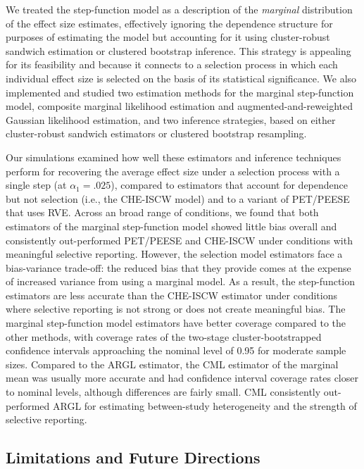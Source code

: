 \documentclass[
  american,
  man, donotrepeattitle,floatsintext]{apa7}
\begin{document}
We treated the step-function model as a description of the \emph{marginal} distribution of the effect size estimates, effectively ignoring the dependence structure for purposes of estimating the model but accounting for it using cluster-robust sandwich estimation or clustered bootstrap inference.
This strategy is appealing for its feasibility and because it connects to a selection process in which each individual effect size is selected on the basis of its statistical significance.
We also implemented and studied two estimation methods for the marginal step-function model, composite marginal likelihood estimation and augmented-and-reweighted Gaussian likelihood estimation, and two inference strategies, based on either cluster-robust sandwich estimators or clustered bootstrap resampling.

Our simulations examined how well these estimators and inference techniques perform for recovering the average effect size under a selection process with a single step (at \(\alpha_1 = .025\)), compared to estimators that account for dependence but not selection (i.e., the CHE-ISCW model) and to a variant of PET/PEESE that uses RVE.
Across an broad range of conditions, we found that both estimators of the marginal step-function model showed little bias overall and consistently out-performed PET/PEESE and CHE-ISCW under conditions with meaningful selective reporting.
However, the selection model estimators face a bias-variance trade-off:
the reduced bias that they provide comes at the expense of increased variance from using a marginal model. As a result, the step-function estimators are less accurate than the CHE-ISCW estimator under conditions where selective reporting is not strong or does not create meaningful bias.
The marginal step-function model estimators have better coverage compared to the other methods, with coverage rates of the two-stage cluster-bootstrapped confidence intervals approaching the nominal level of 0.95 for moderate sample sizes.
Compared to the ARGL estimator, the CML estimator of the marginal mean was usually more accurate and had confidence interval coverage rates closer to nominal levels, although differences are fairly small.
CML consistently out-performed ARGL for estimating between-study heterogeneity and the strength of selective reporting.

\subsection{Limitations and Future Directions}\label{limitations-and-future-directions}
\end{document}
